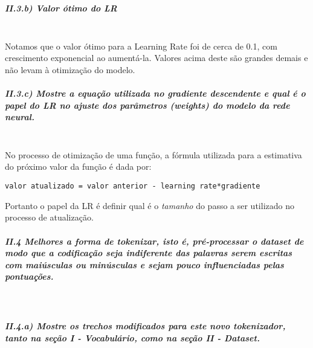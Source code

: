 \documentclass[11pt]{article}
\begin{document}
    \begin{center}
    \end{center}
    { \hspace*{\fill} \\}
    
    \subparagraph{II.3.b) Valor ótimo do
LR}\label{ii.3.b-valor-uxf3timo-do-lr}\mbox{} \\

Notamos que o valor ótimo para a Learning Rate foi de cerca de 0.1, com
crescimento exponencial ao aumentá-la. Valores acima deste são grandes
demais e não levam à otimização do modelo.

\subparagraph{II.3.c) Mostre a equação utilizada no gradiente
descendente e qual é o papel do LR no ajuste dos parâmetros (weights) do
modelo da rede
neural.}\label{ii.3.c-mostre-a-equauxe7uxe3o-utilizada-no-gradiente-descendente-e-qual-uxe9-o-papel-do-lr-no-ajuste-dos-paruxe2metros-weights-do-modelo-da-rede-neural.}\mbox{} \\

No processo de otimização de uma função, a fórmula utilizada para a
estimativa do próximo valor da função é dada por:

\begin{verbatim}
valor atualizado = valor anterior - learning rate*gradiente
\end{verbatim}

Portanto o papel da LR é definir qual é o \emph{tamanho} do passo a ser
utilizado no processo de atualização.

    \subparagraph{II.4 Melhores a forma de tokenizar, isto é, pré-processar
o dataset de modo que a codificação seja indiferente das palavras serem
escritas com maiúsculas ou minúsculas e sejam pouco influenciadas pelas
pontuações.}\label{ii.4-melhores-a-forma-de-tokenizar-isto-uxe9-pruxe9-processar-o-dataset-de-modo-que-a-codificauxe7uxe3o-seja-indiferente-das-palavras-serem-escritas-com-maiuxfasculas-ou-minuxfasculas-e-sejam-pouco-influenciadas-pelas-pontuauxe7uxf5es.}\mbox{} \\

\subparagraph{II.4.a) Mostre os trechos modificados para este novo
tokenizador, tanto na seção I - Vocabulário, como na seção II -
Dataset.}\label{ii.4.a-mostre-os-trechos-modificados-para-este-novo-tokenizador-tanto-na-seuxe7uxe3o-i---vocabuluxe1rio-como-na-seuxe7uxe3o-ii---dataset.}\mbox{} \\
\end{document}
